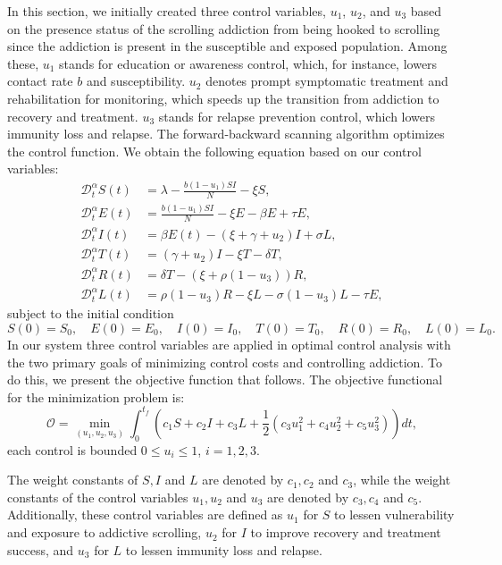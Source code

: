 \documentclass[10pt]{NSP1}
\newcommand{\CD}{\mathcal{D}}
\begin{document}
	In this section, we initially created three control variables, $u_1$, $u_2$, and $u_3$ based on the presence status of the scrolling addiction from being hooked to scrolling since the addiction is present in the susceptible and exposed population. Among these, $u_1$ stands for education or awareness control, which, for instance, lowers contact rate $b$ and susceptibility. $u_2$ denotes prompt symptomatic treatment and rehabilitation for monitoring, which speeds up the transition from addiction to recovery and treatment. $u_3$ stands for relapse prevention control, which lowers immunity loss and relapse. The forward-backward scanning algorithm optimizes the control function. We obtain the following equation based on our control variables:
	\begin{equation}
		\begin{aligned}
			\CD_t^\alpha S(t) &= \lambda - \frac{b(1-u_1) S I}{N} - \xi S, \\
			\CD_t^\alpha E(t) &= \frac{b(1-u_1) S I}{N} - \xi E - \beta E + \tau E, \\
			\CD_t^\alpha I(t) &= \beta E(t) - (\xi + \gamma + u_2) I + \sigma L, \\
			\CD_t^\alpha T(t) &= (\gamma + u_2) I - \xi T - \delta T, \\
			\CD_t^\alpha R(t) &= \delta T - (\xi + \rho(1-u_3)) R, \\
			\CD_t^\alpha L(t) &= \rho(1-u_3) R - \xi L - \sigma(1-u_3) L - \tau E,
		\end{aligned}
		\tag{5.1}
	\end{equation}
	subject to the initial condition
	\begin{equation}
		S(0) = S_0, \quad E(0) = E_0, \quad I(0) = I_0, \quad T(0) = T_0, \quad R(0) = R_0, \quad L(0) = L_0.
		\tag{5.2}
	\end{equation}
	In our system three control variables are applied in optimal control analysis with the two primary goals of minimizing control costs and controlling addiction. To do this, we present the objective function that follows. The objective functional for the minimization problem is:
	\begin{equation}
		\mathcal{O} = \min_{(u_1,u_2,u_3)} \int_0^{t_f} \left( c_1 S + c_2 I + c_3 L + \frac{1}{2} \left( c_3 u_1^2 + c_4 u_2^2 + c_5 u_3^2 \right) \right) dt,
		\tag{5.3}
	\end{equation}
	each control is bounded $0 \leq u_i \leq 1$, $i=1,2,3$.
	
	The weight constants of $S, I$ and $L$ are denoted by $c_1, c_2$ and $c_3$, while the weight constants of the control variables $u_1, u_2$ and $u_3$ are denoted by $c_3, c_4$ and $c_5$. Additionally, these control variables are defined as $u_1$ for $S$ to lessen vulnerability and exposure to addictive scrolling, $u_2$ for $I$ to improve recovery and treatment success, and $u_3$ for $L$ to lessen immunity loss and relapse.
	
\end{document}
